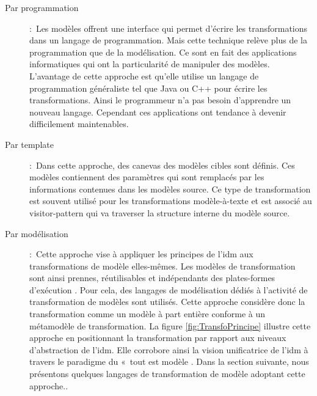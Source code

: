 \begin{description}

\item[Par programmation]:~Les modèles offrent une interface qui permet d'écrire les transformations dans 
un langage de programmation. Mais cette technique relève plus de la 
programmation que de la modélisation. Ce sont en fait des applications 
informatiques qui ont la particularité de manipuler des modèles. L'avantage de 
cette approche est qu'elle utilise un langage de programmation généraliste tel 
que Java ou C++ pour écrire les transformations. Ainsi le programmeur n'a pas 
besoin d'apprendre un nouveau langage. Cependant ces applications ont tendance à 
devenir difficilement maintenables.

\item [Par template]:~Dans cette approche, des canevas des modèles cibles sont définis. Ces modèles contiennent des paramètres qui sont remplacés par les informations contenues 
dans les modèles source. Ce type de transformation est souvent utilisé pour les 
transformations modèle-à-texte et est associé au visitor-pattern qui va 
traverser la structure interne du modèle source.

\item [Par modélisation]:~Cette approche vise à appliquer les principes de l'\gls{idm} aux transformations de modèle elles-mêmes. Les modèles de transformation sont ainsi prennes, réutilisables et indépendants des plates-formes d'exécution  \cite{bezivin2006model}. Pour cela, des langages de modélisation dédiés à l'activité de transformation de modèles sont utilisés. Cette approche considère donc la transformation comme 
un modèle à part entière conforme à un métamodèle de transformation. La figure 
\ref{fig:TransfoPrincipe} illustre cette approche en positionnant la transformation par rapport aux niveaux d'abstraction de l'\gls{idm}. Elle corrobore 
ainsi la vision unificatrice de l'\gls{idm} à travers le paradigme du «~tout est 
modèle \cite{bezivin2005unification}. Dans la section suivante, nous présentons quelques langages de transformation de modèle adoptant cette approche..
\end{description}


